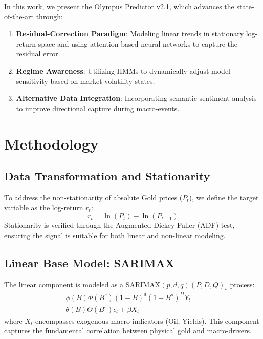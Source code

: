 \documentclass[11pt, a4paper, twocolumn]{article}
\begin{document}
In this work, we present the Olympus Predictor v2.1, which advances the state-of-the-art through:
\begin{enumerate}
    \item \textbf{Residual-Correction Paradigm}: Modeling linear trends in stationary log-return space and using attention-based neural networks to capture the residual error.
    \item \textbf{Regime Awareness}: Utilizing HMMs to dynamically adjust model sensitivity based on market volatility states.
    \item \textbf{Alternative Data Integration}: Incorporating semantic sentiment analysis to improve directional capture during macro-events.
\end{enumerate}

\section{Methodology}

\subsection{Data Transformation and Stationarity}
To address the non-stationarity of absolute Gold prices ($P_t$), we define the target variable as the log-return $r_t$:
\begin{equation}
r_t = \ln(P_t) - \ln(P_{t-1})
\end{equation}
Stationarity is verified through the Augmented Dickey-Fuller (ADF) test, ensuring the signal is suitable for both linear and non-linear modeling.

\subsection{Linear Base Model: SARIMAX}
The linear component is modeled as a SARIMAX$(p, d, q)(P, D, Q)_s$ process:
\begin{equation}
\begin{aligned}
\phi(B)\Phi(B^s)(1-B)^d(1-B^s)^D Y_t = \\
\theta(B)\Theta(B^s) \epsilon_t + \beta X_t
\end{aligned}
\end{equation}
where $X_t$ encompasses exogenous macro-indicators (Oil, Yields). This component captures the fundamental correlation between physical gold and macro-drivers.
\end{document}
